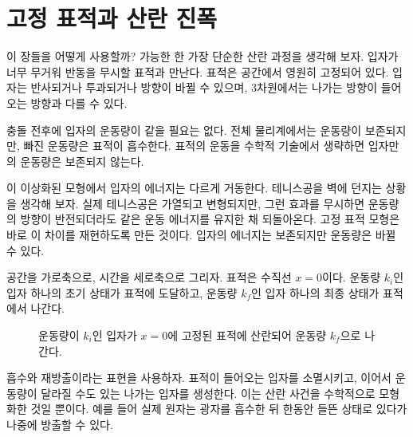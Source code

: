 
\section{고정 표적과 산란 진폭}

이 장들을 어떻게 사용할까? 가능한 한 가장 단순한 산란 과정을 생각해 보자. 입자가 너무 무거워 반동을 무시할 표적과 만난다. 표적은 공간에서 영원히 고정되어 있다. 입자는 반사되거나 투과되거나 방향이 바뀔 수 있으며, 3차원에서는 나가는 방향이 들어오는 방향과 다를 수 있다.

충돌 전후에 입자의 운동량이 같을 필요는 없다. 전체 물리계에서는 운동량이 보존되지만, 빠진 운동량은 표적이 흡수한다. 표적의 운동을 수학적 기술에서 생략하면 입자만의 운동량은 보존되지 않는다.

이 이상화된 모형에서 입자의 에너지는 다르게 거동한다. 테니스공을 벽에 던지는 상황을 생각해 보자. 실제 테니스공은 가열되고 변형되지만, 그런 효과를 무시하면 운동량의 방향이 반전되더라도 같은 운동 에너지를 유지한 채 되돌아온다. 고정 표적 모형은 바로 이 차이를 재현하도록 만든 것이다. 입자의 에너지는 보존되지만 운동량은 바뀔 수 있다.

공간을 가로축으로, 시간을 세로축으로 그리자. 표적은 수직선 \(x=0\)이다. 운동량 \(k_i\)인 입자 하나의 초기 상태가 표적에 도달하고, 운동량 \(k_f\)인 입자 하나의 최종 상태가 표적에서 나간다.

\begin{figure}[h]
\centering
{}
\caption{운동량이 \(k_i\)인 입자가 \(x=0\)에 고정된 표적에 산란되어 운동량 \(k_f\)으로 나간다.}
\end{figure}

흡수와 재방출이라는 표현을 사용하자. 표적이 들어오는 입자를 소멸시키고, 이어서 운동량이 달라질 수도 있는 나가는 입자를 생성한다. 이는 산란 사건을 수학적으로 모형화한 것일 뿐이다. 예를 들어 실제 원자는 광자를 흡수한 뒤 한동안 들뜬 상태로 있다가 나중에 방출할 수 있다.

